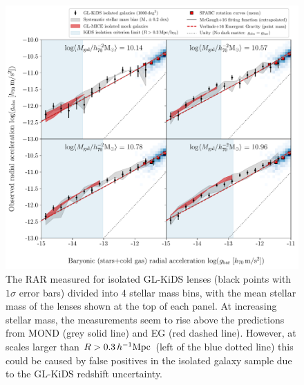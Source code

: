 \documentclass[usenatbib]{mnras}
\newcommand{\hMpc}{\, h^{-1}{\rm{Mpc}} }
\begin{document}
\begin{figure}
	\includegraphics[width=\textwidth]{Figures/RAR_KiDS+MICE+Verlinde_4-massbins_isolated.pdf}
	\caption{The RAR measured for isolated GL-KiDS lenses (black points with $1\sigma$ error bars) divided into 4 stellar mass bins, with the mean stellar mass of the lenses shown at the top of each panel. At increasing stellar mass, the measurements seem to rise above the predictions from MOND (grey solid line) and EG (red dashed line). However, at scales larger than $R > 0.3 \hMpc$ (left of the blue dotted line) this could be caused by false positives in the isolated galaxy sample due to the GL-KiDS redshift uncertainty.}
	\label{fig:RAR_kids_mice_mstarbins}
\end{figure}
\end{document}
